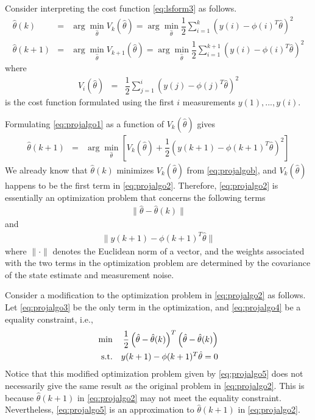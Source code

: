 Consider interpreting the cost function \eqref{eq:lsform3} as follows.
\begin{eqnarray}
    \hat{\theta}(k) &=& \arg \min_{\hat{\theta}} V_k(\hat{\theta})
    = \arg \min_{\hat{\theta}} \dfrac{1}{2}\sum_{i=1}^{k} \left(y(i) - \phi(i)^T\hat{\theta}\right)^2 \label{eq:projalgob} \\
    \hat{\theta}(k+1) &=& \arg \min_{\hat{\theta}} V_{k+1}(\hat{\theta})
    = \arg \min_{\hat{\theta}} \dfrac{1}{2}\sum_{i=1}^{k+1} \left(y(i) - \phi(i)^T\hat{\theta}\right)^2 \label{eq:projalgo1}
\end{eqnarray}
where
\begin{eqnarray}
  V_i(\hat{\theta}) &=& \dfrac{1}{2}\sum_{j=1}^{i} \left(y(j) - \phi(j)^T\hat{\theta}\right)^2 \nonumber
\end{eqnarray}
is the cost function formulated using the first $i$ measurements $y(1), ..., y(i)$.

Formulating \eqref{eq:projalgo1} as a function of $V_k(\hat{\theta})$ gives
\begin{eqnarray}
  \hat{\theta}(k+1) &=& \arg \min_{\hat{\theta}} \left[ V_k(\hat{\theta}) + \dfrac{1}{2} \left(y(k+1) - \phi(k+1)^T\hat{\theta}\right)^2\right] \label{eq:projalgo2}
\end{eqnarray}
We already know that $\hat{\theta}(k)$ minimizes $V_k(\hat{\theta})$ from \eqref{eq:projalgob}, and $V_k(\hat{\theta})$ happens to be the first term in \eqref{eq:projalgo2}. Therefore, \eqref{eq:projalgo2} is essentially an optimization problem that concerns the following terms
\begin{eqnarray}
  \lVert \hat{\theta} - \hat{\theta}(k) \rVert \label{eq:projalgo3}
\end{eqnarray}
and
\begin{eqnarray}
\lVert y(k+1) - \phi(k+1)^T\hat{\theta} \rVert \label{eq:projalgo4}
\end{eqnarray}
where $\lVert \cdot \rVert$ denotes the Euclidean norm of a vector, and the weights associated with the two terms in the optimization problem are determined by the covariance of the state estimate and measurement noise.

Consider a modification to the optimization problem in \eqref{eq:projalgo2} as follows. Let \eqref{eq:projalgo3} be the only term in the optimization, and \eqref{eq:projalgo4} be a equality constraint, i.e.,
\begin{eqnarray}
    \textup{min} && \dfrac{1}{2} \left(\hat{\theta} - \hat{\theta}(k)\right)^T\left(\hat{\theta} - \hat{\theta}(k)\right) \label{eq:projalgo5} \\
    \textup{s.t.} && y(k+1) - \phi(k+1)^T\hat{\theta} = 0 \label{eq:projalgo52}
\end{eqnarray}
Notice that this modified optimization problem given by \eqref{eq:projalgo5} does not necessarily give the same result as the original problem in \eqref{eq:projalgo2}. This is because $ \hat{\theta}(k+1)$ in \eqref{eq:projalgo2} may not meet the equality constraint. Nevertheless, \eqref{eq:projalgo5} is an approximation to $\hat{\theta}(k+1)$ in \eqref{eq:projalgo2}.

